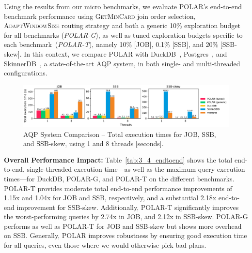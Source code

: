 Using the results from our micro benchmarks, we evaluate POLAR's end-to-end benchmark performance using \textsc{GetMinCard} join order selection, \textsc{AdaptWindowSize} routing strategy and both a generic 10\% exploration budget for all benchmarks (\textit{POLAR-G}), as well as tuned exploration budgets specific to each benchmark~(\mbox{\textit{POLAR-T}}), namely 10\% [JOB], 0.1\% [SSB], and 20\% [SSB-skew]. In this context, we compare POLAR with DuckDB~\cite{RaasveldtM19}, Postgres~\cite{DBLP:conf/sigmod/StonebrakerR86}, and SkinnerDB~\cite{TrummerWMMJA19}, a state-of-the-art AQP system, in both single- and multi-threaded configurations.



\begin{figure}
    \centering
    \includegraphics[width=\textwidth]{figures/4_1_total.pdf}
    \vspace{-0.55cm}
    \caption{AQP System Comparison -- Total execution times for JOB, SSB, and SSB-skew, using 1 and 8 threads [seconds].}
    \label{fig:4_1_total}
\end{figure}

\textbf{Overall Performance Impact:} Table~\ref{tab:3_4_endtoend} shows the total end-to-end, single-threaded execution time---as well as the maximum query execution times---for DuckDB, POLAR-G, and POLAR-T on the different benchmarks. POLAR-T provides moderate total end-to-end performance improvements of 1.15x and 1.04x for JOB and SSB, respectively, and a substantial 2.18x end-to-end improvement for SSB-skew. Additionally, POLAR-T significantly improves the worst-performing queries by 2.74x in JOB, and 2.12x in SSB-skew. POLAR-G performs as well as POLAR-T for JOB and SSB-skew but shows more overhead on SSB. Generally, POLAR improves robustness by ensuring good execution time for all queries, even those where we would otherwise pick bad plans. 

